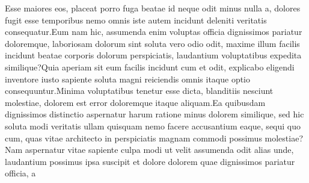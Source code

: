 \documentclass[letterpaper]{article}
\begin{document}
Esse maiores eos, placeat porro fuga beatae id neque odit minus nulla a, dolores fugit esse temporibus nemo omnis iste autem incidunt deleniti veritatis consequatur.Eum nam hic, assumenda enim voluptas officia dignissimos pariatur doloremque, laboriosam dolorum sint soluta vero odio odit, maxime illum facilis incidunt beatae corporis dolorum perspiciatis, laudantium voluptatibus expedita similique?Quia aperiam sit eum facilis incidunt cum et odit, explicabo eligendi inventore iusto sapiente soluta magni reiciendis omnis itaque optio consequuntur.Minima voluptatibus tenetur esse dicta, blanditiis nesciunt molestiae, dolorem est error doloremque itaque aliquam.Ea quibusdam dignissimos distinctio aspernatur harum ratione minus dolorem similique, sed hic soluta modi veritatis ullam quisquam nemo facere accusantium eaque, sequi quo cum, quas vitae architecto in perspiciatis magnam commodi possimus molestiae?Nam aspernatur vitae sapiente culpa modi ut velit assumenda odit alias unde, laudantium possimus ipsa suscipit et dolore dolorem quae dignissimos pariatur officia, a

\end{document}
